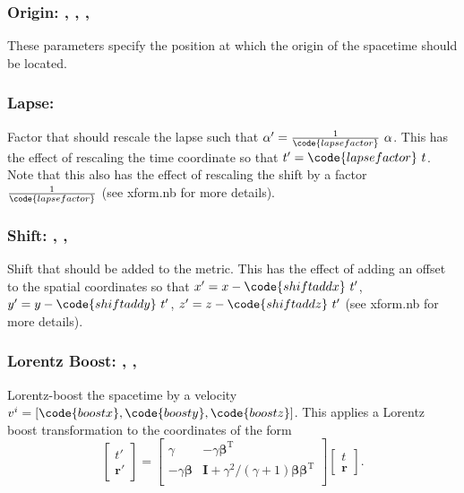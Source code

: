 \documentclass{article}
\begin{document}
\subsubsection{Origin: , , , }
These parameters specify the position at which the origin of the spacetime
should be located.

\subsubsection{Lapse: }
Factor that should rescale the lapse such that
$\alpha' = \tfrac{1}{\code{lapsefactor}}~ \alpha$. This has the effect of rescaling the time
coordinate so that $t' = \code{lapsefactor}~ t$. Note that this also has the
effect of rescaling the shift by a factor $\tfrac{1}{\code{lapsefactor}}$ (see xform.nb
for more details).

\subsubsection{Shift: , , }
Shift that should be added to the metric. This has the effect of adding an
offset to the spatial coordinates so that $x' = x - \code{shiftaddx}~ t'$,
$y' = y - \code{shiftaddy}~ t'$,  $z' = z - \code{shiftaddz}~ t'$ (see xform.nb
for more details).

\subsubsection{Lorentz Boost: , , }
Lorentz-boost the spacetime by a velocity
$v^i = [\code{boostx}, \code{boosty}, \code{boostz}]$. This applies a
Lorentz boost transformation to the coordinates of the form
\begin{equation}
\begin{bmatrix}
t' \\
\mathbf{r'}
\end{bmatrix}
=
\begin{bmatrix}
\gamma & - \gamma \boldsymbol{\beta}^\mathrm{T} \\
-\gamma\boldsymbol{\beta} & \mathbf{I} + \gamma^2 / (\gamma+1) \boldsymbol{\beta}\boldsymbol{\beta}^\mathrm{T}  \\
\end{bmatrix}
\begin{bmatrix}
t  \\
\mathbf{r}
\end{bmatrix}.
\end{equation}
\end{document}
